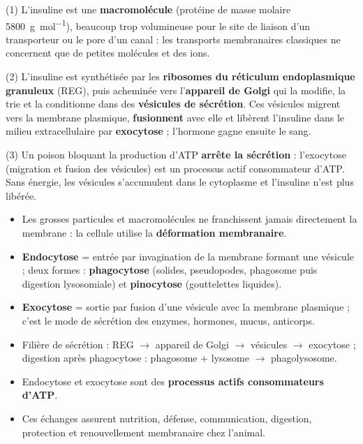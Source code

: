 \documentclass[11pt]{article}
\begin{document}
\begin{corrige}
(1) L'insuline est une \textbf{macromolécule} (protéine de masse molaire \SI{5800}{\g\per\mol}), beaucoup trop volumineuse pour le site de liaison d'un transporteur ou le pore d'un canal : les transports membranaires classiques ne concernent que de petites molécules et des ions.

(2) L'insuline est synthétisée par les \textbf{ribosomes du réticulum endoplasmique granuleux} (REG), puis acheminée vers l'\textbf{appareil de Golgi} qui la modifie, la trie et la conditionne dans des \textbf{vésicules de sécrétion}. Ces vésicules migrent vers la membrane plasmique, \textbf{fusionnent} avec elle et libèrent l'insuline dans le milieu extracellulaire par \textbf{exocytose} ; l'hormone gagne ensuite le sang.

(3) Un poison bloquant la production d'ATP \textbf{arrête la sécrétion} : l'exocytose (migration et fusion des vésicules) est un processus actif consommateur d'ATP. Sans énergie, les vésicules s'accumulent dans le cytoplasme et l'insuline n'est plus libérée.
\end{corrige}

\begin{aretenir}
\begin{itemize}
\item Les grosses particules et macromolécules ne franchissent jamais directement la membrane : la cellule utilise la \textbf{déformation membranaire}.
\item \textbf{Endocytose} = entrée par invagination de la membrane formant une vésicule ; deux formes : \textbf{phagocytose} (solides, pseudopodes, phagosome puis digestion lysosomiale) et \textbf{pinocytose} (gouttelettes liquides).
\item \textbf{Exocytose} = sortie par fusion d'une vésicule avec la membrane plasmique ; c'est le mode de sécrétion des enzymes, hormones, mucus, anticorps.
\item Filière de sécrétion : REG $\rightarrow$ appareil de Golgi $\rightarrow$ vésicules $\rightarrow$ exocytose ; digestion après phagocytose : phagosome + lysosome $\rightarrow$ phagolysosome.
\item Endocytose et exocytose sont des \textbf{processus actifs consommateurs d'ATP}.
\item Ces échanges assurent nutrition, défense, communication, digestion, protection et renouvellement membranaire chez l'animal.
\end{itemize}
\end{aretenir}
\end{document}
